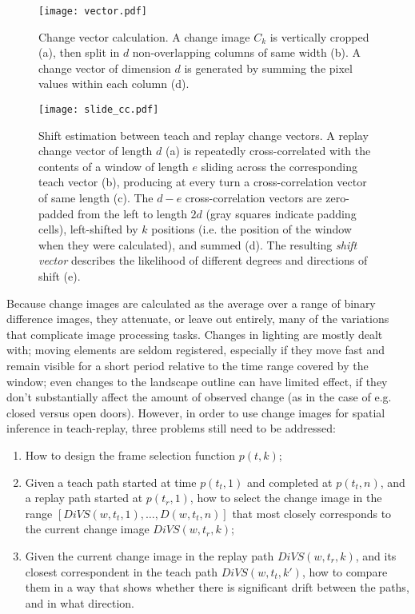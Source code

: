 \documentclass[twocolumn, 9pt,fleqn]{jsproceedings}
\begin{document}
\begin{figure}[h!]
\texttt{[image: vector.pdf]}
\caption{Change vector calculation. A change image $C_k$ is vertically cropped (a), then split in $d$ non-overlapping columns of same width (b). A change vector of dimension $d$ is generated by summing the pixel values within each column (d).}
\label{fig:vector}
\end{figure}

\begin{figure}[h!]
\texttt{[image: slide\_cc.pdf]}
\caption{Shift estimation between teach and replay change vectors. A replay change vector of length $d$ (a) is repeatedly cross-correlated with the contents of a window of length $e$ sliding across the corresponding teach vector (b), producing at every turn a cross-correlation vector of same length (c). The $d - e$ cross-correlation vectors are zero-padded from the left to length $2d$ (gray squares indicate padding cells), left-shifted by $k$ positions (i.e. the position of the window when they were calculated), and summed (d). The resulting \textit{shift vector} describes the likelihood of different degrees and directions of shift (e).}
\label{fig:slide_cc}
\end{figure}

Because change images are calculated as the average over a range of binary difference images, they attenuate, or leave out entirely, many of the variations that complicate image processing tasks. Changes in lighting are mostly dealt with; moving elements are seldom registered, especially if they move fast and remain visible for a short period relative to the time range covered by the window; even changes to the landscape outline can have limited effect, if they don't substantially affect the amount of observed change (as in the case of e.g. closed versus open doors). However, in order to use change images for spatial inference in teach-replay, three problems still need to be addressed:

\begin{enumerate}
\item How to design the frame selection function $p(t, k)$;
\item Given a teach path started at time $p(t_t, 1)$ and completed at $p(t_t, n)$, and a replay path started at $p(t_r, 1)$, how to select the change image in the range $[DiVS(w, t_t, 1), \dotsc, D(w, t_t, n)]$ that most closely corresponds to the current change image $DiVS(w, t_r, k)$;
\item Given the current change image in the replay path $DiVS(w, t_r, k)$, and its closest correspondent in the teach path $DiVS(w, t_t, k')$, how to compare them in a way that shows whether there is significant drift between the paths, and in what direction.
\end{enumerate}
\end{document}
